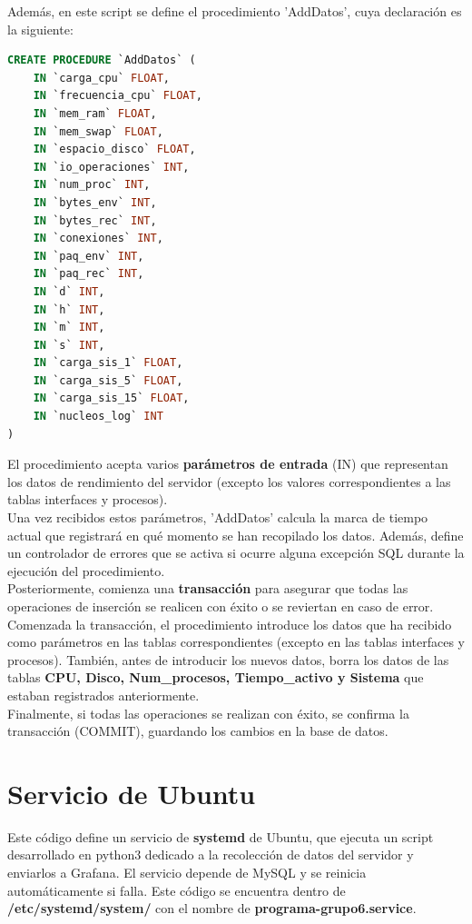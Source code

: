 \documentclass{article}
\begin{document}
Además, en este script se define el procedimiento 'AddDatos', cuya declaración es la siguiente:\\

\begin{lstlisting}[language=sql]
CREATE PROCEDURE `AddDatos` (
    IN `carga_cpu` FLOAT,
    IN `frecuencia_cpu` FLOAT,
    IN `mem_ram` FLOAT,
    IN `mem_swap` FLOAT,
    IN `espacio_disco` FLOAT,
    IN `io_operaciones` INT,
    IN `num_proc` INT,
    IN `bytes_env` INT,
    IN `bytes_rec` INT,
    IN `conexiones` INT,
    IN `paq_env` INT,
    IN `paq_rec` INT,
    IN `d` INT,
    IN `h` INT,
    IN `m` INT,
    IN `s` INT,
    IN `carga_sis_1` FLOAT,
    IN `carga_sis_5` FLOAT,
    IN `carga_sis_15` FLOAT,
    IN `nucleos_log` INT
)
\end{lstlisting}

\vspace{0.4cm}
El procedimiento acepta varios \textbf{parámetros de entrada} (IN) que representan los datos de rendimiento del servidor (excepto los valores correspondientes a las tablas interfaces y procesos).\\

Una vez recibidos estos parámetros, 'AddDatos' calcula la marca de tiempo actual que registrará en qué momento se han recopilado los datos. Además, define un controlador de errores que se activa si ocurre alguna excepción SQL durante la ejecución del procedimiento.\\

Posteriormente, comienza una \textbf{transacción} para asegurar que todas las operaciones de inserción se realicen con éxito o se reviertan en caso de error.\\

Comenzada la transacción, el procedimiento introduce los datos que ha recibido como parámetros en las tablas correspondientes (excepto en las tablas interfaces y procesos). También, antes de introducir los nuevos datos, borra los datos de las tablas  \textbf{CPU, Disco, Num\_procesos, Tiempo\_activo y Sistema} que estaban registrados anteriormente.\\

Finalmente, si todas las operaciones se realizan con éxito, se confirma la transacción (COMMIT), guardando los cambios en la base de datos.

\section{Servicio de Ubuntu}\label{sec:servicio-ubuntu}
Este código define un servicio de \textbf{systemd} de Ubuntu, que ejecuta un script desarrollado en python3 dedicado a la recolección de datos del servidor y enviarlos a Grafana. El servicio depende de MySQL y se reinicia automáticamente si falla.
Este código se encuentra dentro de \textbf{/etc/systemd/system/} con el nombre de \textbf{programa-grupo6.service}.
\\
\end{document}
